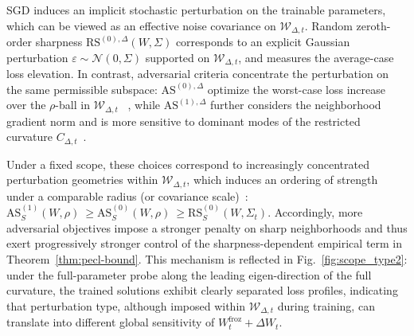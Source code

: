 \documentclass{article}
\theoremstyle{plain}
\theoremstyle{definition}
\theoremstyle{remark}
\begin{document}
SGD induces an implicit stochastic perturbation on the trainable parameters, which can be viewed as an effective noise covariance on $\mathcal W_{\Delta,t}$\cite{pmlr-v97-zhu19e}. Random zeroth-order sharpness $\mathrm{RS}^{(0),\Delta}(W,\Sigma)$ corresponds to an explicit Gaussian perturbation $\varepsilon\sim\mathcal N(0,\Sigma)$ supported on $\mathcal W_{\Delta,t}$, and measures the average-case loss elevation. In contrast, adversarial criteria concentrate the perturbation on the same permissible subspace: $\mathrm{AS}^{(0),\Delta}$ optimize the worst-case loss increase over the $\rho$-ball in $\mathcal W_{\Delta,t}$ ~\cite{foretSharpnessAwareMinimizationEfficiently2021}, while $\mathrm{AS}^{(1),\Delta}$ further considers the neighborhood gradient norm and is more sensitive to dominant modes of the restricted curvature $C_{\Delta,t}$~\cite{Zhang_GAM}. 




Under a fixed scope, these choices correspond to increasingly concentrated perturbation geometries within $\mathcal W_{\Delta,t}$, which induces an ordering of strength under a comparable radius (or covariance scale)~\cite{mollenhoffSAMOptimalRelaxation2022,Zhang_GAM}:
$ \mathrm{AS}^{(1)}_S(W,\rho)\ \ge \mathrm{AS}^{(0)}_S(W,\rho)\ \ge \mathrm{RS}^{(0)}_S(W,\Sigma_t).$
Accordingly, more adversarial objectives impose a stronger penalty on sharp neighborhoods and thus exert progressively stronger control of the sharpness-dependent empirical term in Theorem~\ref{thm:pecl-bound}.
This mechanism is reflected in Fig.~\ref{fig:scope_type2}: under the full-parameter probe along the leading eigen-direction of the full curvature, the trained solutions exhibit clearly separated loss profiles, indicating that perturbation type, although imposed within $\mathcal W_{\Delta,t}$ during training, can translate into different global sensitivity of $W^{\mathrm{froz}}_t+\Delta W_t$.
\end{document}
